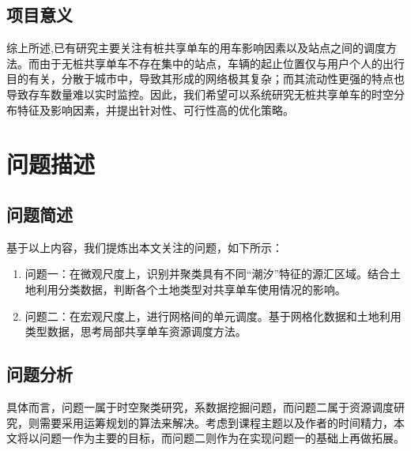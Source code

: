 \documentclass[12pt,a4paper,oneside]{ctexart}
\begin{document}
\subsection{项目意义}

综上所述,已有研究主要关注有桩共享单车的用车影响因素以及站点之间的调度方法。而由于无桩共享单车不存在集中的站点，车辆的起止位置仅与用户个人的出行目的有关，分散于城市中，导致其形成的网络极其复杂；而其流动性更强的特点也导致存车数量难以实时监控。因此，我们希望可以系统研究无桩共享单车的时空分布特征及影响因素，并提出针对性、可行性高的优化策略。

\section{问题描述}

\subsection{问题简述}

基于以上内容，我们提炼出本文关注的问题，如下所示：
\begin{enumerate}
    \item 问题一：在微观尺度上，识别并聚类具有不同“潮汐”特征的源汇区域。结合土地利用分类数据，判断各个土地类型对共享单车使用情况的影响。
    \item 问题二：在宏观尺度上，进行网格间的单元调度。基于网格化数据和土地利用类型数据，思考局部共享单车资源调度方法。
\end{enumerate}

\subsection{问题分析}
具体而言，问题一属于时空聚类研究，系数据挖掘问题，而问题二属于资源调度研究，则需要采用运筹规划的算法来解决。考虑到课程主题以及作者的时间精力，本文将以问题一作为主要的目标，而问题二则作为在实现问题一的基础上再做拓展。
\end{document}
